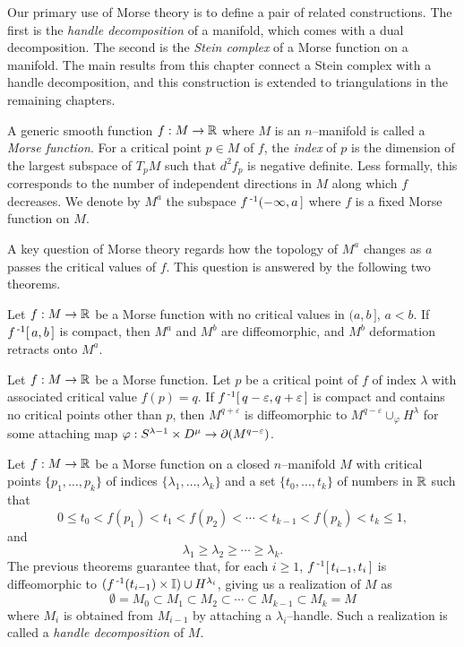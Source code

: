\label{sec:morsetheory}

Our primary use of Morse theory is to define a pair of related constructions.
The first is the \emph{handle decomposition} of a manifold, which comes with a dual decomposition.
The second is the \emph{Stein complex} of a Morse function on a manifold.
The main results from this chapter connect a Stein complex with a handle decomposition, and this construction is extended to triangulations in the remaining chapters.

\begin{defn}
	A generic smooth function $f:M\to\mathbb{R}$ where $M$ is an $n$--manifold is called a \emph{Morse function}.
	For a critical point $p\in M$ of $f$, the \emph{index} of $p$ is the dimension of the largest subspace of $T_p M$ such that $d^2f_p$ is negative definite.
	Less formally, this corresponds to the number of independent directions in $M$ along which $f$ decreases.
	We denote by $M^a$ the subspace $f^{\,\text{-}1}(-\infty,a\,]$ where $f$ is a fixed Morse function on $M$.
\end{defn}

A key question of Morse theory regards how the topology of $M^a$ changes as $a$ passes the critical values of $f$.
This question is answered by the following two theorems.

\begin{theorem}
	\label{thm:morseretract}
	Let $f:M\to\mathbb{R}$ be a Morse function with no critical values in $(a,b\,]$, $a<b$.
	If $f^{\,\text{-}1}[\,a,b\,]$ is compact, then $M^a$ and $M^b$ are diffeomorphic, and $M^b$ deformation retracts onto $M^a$.
\end{theorem}

\begin{theorem}
	\label{thm:morsehandle}
	Let $f:M\to\mathbb{R}$ be a Morse function.
	Let $p$ be a critical point of $f$ of index $\lambda$ with associated critical value $f(p)=q$.
	If $f^{\,\text{-}1}[\,q-\varepsilon, q+\varepsilon\,]$ is compact and contains no critical points other than $p$, then $M^{q+\varepsilon}$ is diffeomorphic to $M^{q-\varepsilon}\cup_\varphi H^\lambda$ for some attaching map $\varphi:S^{\lambda-1}\times D^\mu\to \partial(M^{q-\varepsilon})$.
\end{theorem}

\begin{defn}
	Let $f:M\to\mathbb{R}$ be a Morse function on a closed $n$--manifold $M$ with critical points $\{p_1,\dots,p_k\}$ of indices $\{\lambda_1,\dots,\lambda_k\}$ and a set $\{t_0,\dots,t_k\}$ of numbers in $\mathbb{R}$ such that
	\[
		0\leq t_0 < f(p_1) < t_1 < f(p_2) < \cdots < t_{k-1} < f(p_k) < t_k \leq 1,
	\]
	and
	\[
		\lambda_1 \geq \lambda_2 \geq \cdots \geq \lambda_k.
	\]
	The previous theorems guarantee that, for each $i\geq 1$, $f^{\,\text{-}1}[\,t_{i-1},t_i\,]$ is diffeomorphic to $(f^{\,\text{-}1}(t_{i-1})\times\mathbb{I})\cup H^{\lambda_i}$, giving us a realization of $M$ as
	\[
		\emptyset = M_0 \subset M_1 \subset M_2 \subset \cdots \subset M_{k-1} \subset M_k = M
	\]
	where $M_i$ is obtained from $M_{i-1}$ by attaching a $\lambda_i$--handle.
	Such a realization is called a \emph{handle decomposition} of $M$.
\end{defn}

